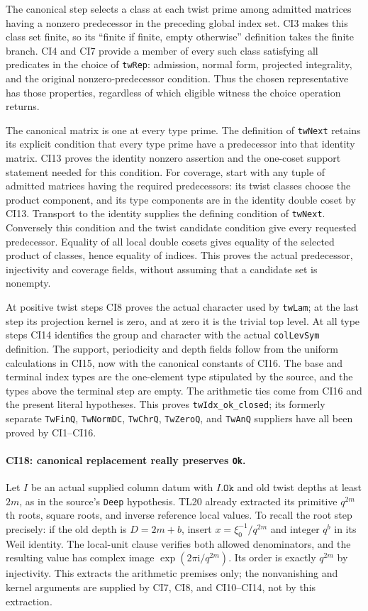 The canonical step selects a class at each twist prime among
admitted matrices having a nonzero predecessor in the preceding
global index set. CI3 makes this class set finite, so its
``finite if finite, empty otherwise'' definition takes the
finite branch. CI4 and CI7 provide a member of every such class
satisfying all predicates in the choice of \texttt{twRep}:
admission, normal form, projected integrality, and the original
nonzero-predecessor condition. Thus the chosen representative
has those properties, regardless of which eligible witness
the choice operation returns.

The canonical matrix is one at every type prime. The definition
of \texttt{twNext} retains its explicit condition that every
type prime have a predecessor into that identity matrix.
CI13 proves the identity nonzero assertion and the one-coset
support statement needed for this condition. For coverage,
start with any tuple of admitted matrices having the required
predecessors: its twist classes choose the product component,
and its type components are in the identity double coset by
CI13. Transport to the identity supplies the defining condition
of \texttt{twNext}. Conversely this condition and the twist
candidate condition give every requested predecessor. Equality
of all local double cosets gives equality of the selected
product of classes, hence equality of indices. This proves the
actual predecessor, injectivity and coverage fields, without
assuming that a candidate set is nonempty.

At positive twist steps CI8 proves the actual character used
by \texttt{twLam}; at the last step its projection kernel is
zero, and at zero it is the trivial top level. At all type
steps CI14 identifies the group and character with the actual
\texttt{colLevSym} definition. The support, periodicity and
depth fields follow from the uniform calculations in CI15,
now with the canonical constants of CI16. The base and terminal
index types are the one-element type stipulated by the source,
and the types above the terminal step are empty. The arithmetic
ties come from CI16 and the present literal hypotheses.
This proves \texttt{twIdx\_ok\_closed}; its formerly separate
\texttt{TwFinQ}, \texttt{TwNormDC}, \texttt{TwChrQ},
\texttt{TwZeroQ}, and \texttt{TwAnQ} suppliers have all been
proved by CI1--CI16.

\paragraph{CI18: canonical replacement really preserves \texttt{Ok}.}
Let $I$ be an actual supplied column datum with
$I.\texttt{Ok}$ and old twist depths at least $2m$, as in the
source's \texttt{Deep} hypothesis. TL20 already extracted its
primitive $q^{2m}$th roots, square roots, and inverse reference
local values. To recall the root step precisely: if the old
depth is $D=2m+b$, insert
$x=\xi_0^{-1}/q^{2m}$ and integer $q^b$ in its Weil identity.
The local-unit clause verifies both allowed denominators, and
the resulting value has complex image
$\exp(2\pi\mathrm i/q^{2m})$. Its order is exactly $q^{2m}$
by injectivity. This extracts the arithmetic premises only;
the nonvanishing and kernel arguments are supplied by CI7,
CI8, and CI10--CI14, not by this extraction.

